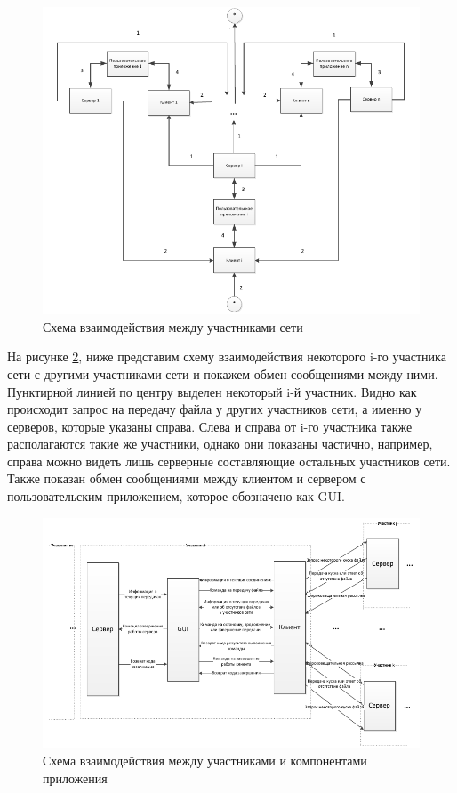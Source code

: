 \begin{figure}[tb!]
    \centering
    \hspace*{-2cm}
    \includegraphics[scale=0.9]{pic_9}
    \caption{Схема взаимодействия между участниками сети}\label{pic_9}
\end{figure}

На рисунке \ref{pic_10}, ниже представим схему взаимодействия некоторого i-го
участника сети с другими участниками сети и покажем обмен сообщениями
между ними. Пунктирной линией по центру выделен некоторый i-й участник.
Видно как происходит запрос на передачу файла у других участников сети, а
именно у серверов, которые указаны справа. Слева и справа от i-го участника
также располагаются такие же участники, однако они показаны частично,
например, справа можно видеть лишь серверные составляющие остальных
участников сети. Также показан обмен сообщениями между клиентом и
сервером с пользовательским приложением, которое обозначено как GUI.

\begin{figure}[tb!]
    \centering
    \hspace*{-2cm}
    \includegraphics[scale=0.9]{pic_10}
    \caption{Схема взаимодействия между участниками и компонентами приложения}\label{pic_10}
\end{figure}

